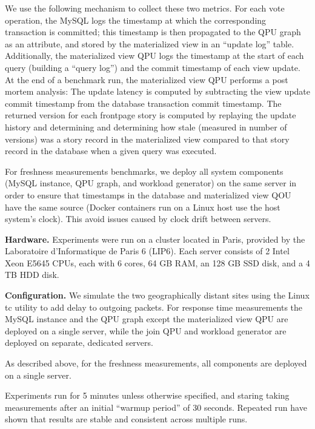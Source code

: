 We use the following mechanism to collect these two metrics.
For each vote operation, the MySQL logs the timestamp at which the corresponding transaction is committed;
this timestamp is then propagated to the QPU graph as an attribute, and stored by the materialized view in an
``update log'' table.
Additionally, the materialized view QPU logs the timestamp at the start of each query (building a ``query log'')
and the commit timestamp of each view update.
At the end of a benchmark run, the materialized view QPU performs a post mortem analysis:
The update latency is computed by subtracting the view update commit timestamp from the database transaction commit
timestamp.
The returned version for each frontpage story is computed by replaying the update history and determining and determining
how stale (measured in number of versions) was a story record in the materialized view compared to that story record in the database
when a given query was executed.

For freshness measurements benchmarks,
we deploy all system components (MySQL instance, QPU graph, and workload generator) on the same server in order to ensure
that timestamps in the database and materialized view QOU have the same source (Docker containers run on a Linux host use
the host system's clock).
This avoid issues caused by clock drift between servers.

\bigskip
\noindent
\textbf{Hardware.}
Experiments were run on a cluster located in Paris, provided by the Laboratoire d'Informatique de Paris 6 (LIP6).
Each server consists of 2 Intel Xeon E5645 CPUs, each with 6 cores, 64 GB RAM, an 128 GB SSD disk, and a 4 TB HDD disk.

\bigskip
\noindent
\textbf{Configuration.}
We simulate the two geographically distant sites using the Linux tc utility \cite{tc} to add delay to outgoing packets.
For response time measurements the MySQL instance and the QPU graph except the materialized view QPU are deployed on a single
server, while the join QPU and workload generator are deployed on separate, dedicated servers.

As described above, for the freshness measurements, all components are deployed on a single server.

Experiments run for 5 minutes unless otherwise specified, and staring taking measurements after an initial ``warmup period''
of 30 seconds.
Repeated run have shown that results are stable and consistent across multiple runs.


